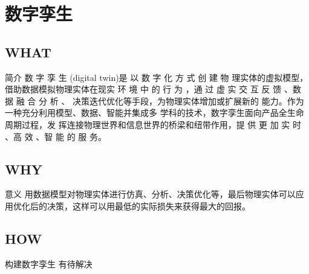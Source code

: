 \documentclass[notheorems, aspectratio=54]{beamer}
\begin{document}
\section{数字孪生}
\subsection{WHAT}
\begin{frame}{简介}
    数 字 孪 生 (digital twin)是 以 数 字 化 方 式 创 建 物 理实体的虚拟模型，借助数据模拟物理实体在现实 环 境 中 的 行 为 ，通 过 虚 实 交 互 反 馈 、数 据 融 合 分 析 、 决策迭代优化等手段，为物理实体增加或扩展新的 能力。作为一种充分利用模型、数据、智能并集成多 学科的技术，数字孪生面向产品全生命周期过程，发 挥连接物理世界和信息世界的桥梁和纽带作用，提 供 更 加 实 时 、高 效 、智 能 的 服 务。
\end{frame}

\subsection{WHY}
\begin{frame}{意义}
    用数据模型对物理实体进行仿真、分析、决策优化等，最后物理实体可以应用优化后的决策，这样可以用最低的实际损失来获得最大的回报。
\end{frame}
\subsection{HOW}
\begin{frame}{构建数字孪生}
    有待解决
\end{frame}
\end{document}
